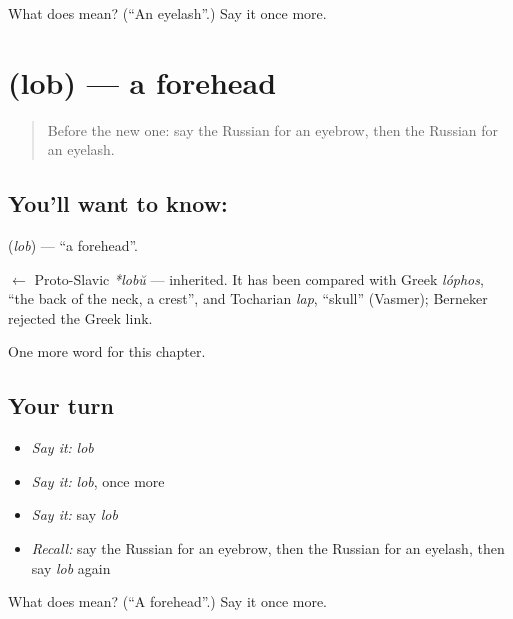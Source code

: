 \begin{tcolorbox}[breakable,colback=teal!4,colframe=teal!35!black,title={Before you move on}]
What does  mean? (\textquotedblleft{}An eyelash\textquotedblright{}.) Say it once more.
\end{tcolorbox}
\section[\texorpdfstring{\ru{лоб} (lob)}{лоб (lob)}]{ (lob) — a forehead}

\label{lesson:RU-C239-lob}



\begin{quote}
Before the new one: say the Russian for an eyebrow, then the Russian for an eyelash.
\end{quote}

\subsection*{You'll want to know: }
\textbf{} (\emph{lob}) — \textquotedblleft{}a forehead\textquotedblright{}.

\begin{cousinweb}
\textbf{} $\leftarrow$ Proto-Slavic \emph{*lobŭ} — inherited. It has been compared with Greek \emph{lóphos}, \textquotedblleft{}the back of the neck, a crest\textquotedblright{}, and Tocharian \emph{lap}, \textquotedblleft{}skull\textquotedblright{} (Vasmer); Berneker rejected the Greek link.
\end{cousinweb}

\begin{grammarlens}[title={What you've built}]
One more word for this chapter.
\end{grammarlens}

\subsection*{Your turn}
\begin{itemize}
\raggedright
  \item \emph{Say it:} \emph{lob}
  \item \emph{Say it:} \emph{lob}, once more
  \item \emph{Say it:} say \emph{lob}
  \item \emph{Recall:} say the Russian for an eyebrow, then the Russian for an eyelash, then say \emph{lob} again
\end{itemize}

\begin{tcolorbox}[breakable,colback=teal!4,colframe=teal!35!black,title={Before you move on}]
What does  mean? (\textquotedblleft{}A forehead\textquotedblright{}.) Say it once more.
\end{tcolorbox}
